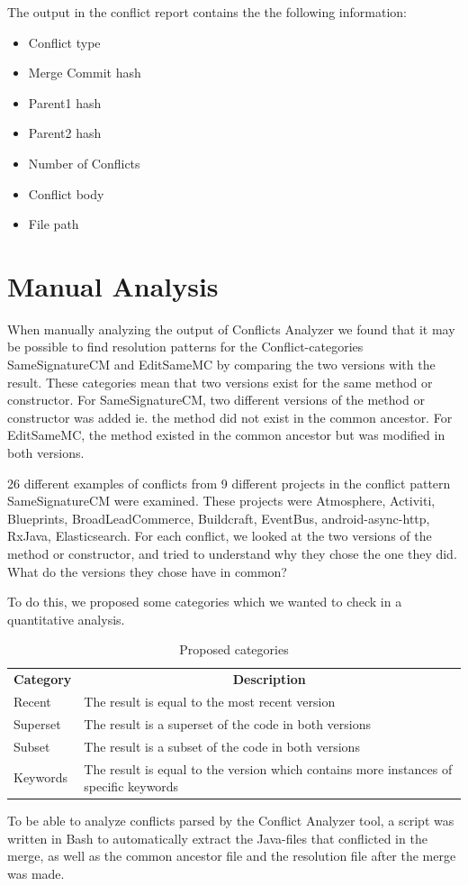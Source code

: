 The output in the conflict report contains the the following information:
\begin{itemize}
\item Conflict type
\item Merge Commit hash
\item Parent1 hash
\item Parent2 hash
\item Number of Conflicts
\item Conflict body
\item File path
\end{itemize}

\section{Manual Analysis}
When manually analyzing the output of Conflicts Analyzer we found that it may be possible to find resolution patterns for the Conflict-categories SameSignatureCM and EditSameMC by comparing the two versions with the result. These categories mean that two versions exist for the same method or constructor. For SameSignatureCM, two different versions of the method or constructor was added ie. the method did not exist in the common ancestor. For EditSameMC, the method existed in the common ancestor but was modified in both versions.

26 different examples of conflicts from 9 different projects in the conflict pattern SameSignatureCM were examined. These projects were Atmosphere, Activiti, Blueprints, BroadLeadCommerce, Buildcraft, EventBus, android-async-http, RxJava, Elasticsearch. For each conflict, we looked at the two versions of the method or constructor, and tried to understand why they chose the one they did. What do the versions they chose have in common?

To do this, we proposed some categories which we wanted to check in a quantitative analysis.
\begin{table}
\begin{tabular}{ p{8cm} p{6cm} }
\hline
\multicolumn{1}{c}{\textbf{Category}} & \multicolumn{1}{c}{\textbf{Description}}\\
Recent & The result is equal to the most recent version\\
Superset & The result is a superset of the code in both versions\\
Subset & The result is a subset of the code in both versions\\
Keywords & The result is equal to the version which contains more instances of specific keywords\\
\end{tabular}
\caption{Proposed categories}\label{table:pcategories}
\end{table}
To be able to analyze conflicts parsed by the Conflict Analyzer tool, a script was written in Bash to automatically extract the Java-files that conflicted in the merge, as well as the common ancestor file and the resolution file after the merge was made.

